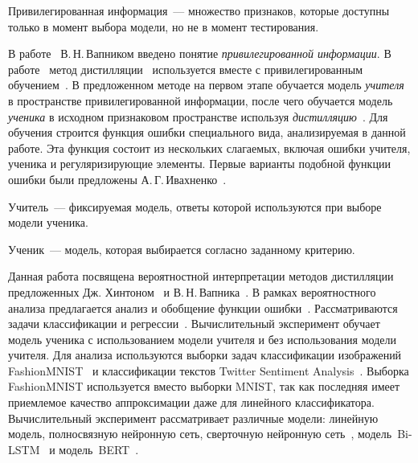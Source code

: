 \documentclass[12pt]{a&t}
\begin{document}
\begin{definition}
Привилегированная информация~--- множество признаков, которые доступны только в момент выбора модели, но не в момент тестирования.
\end{definition}
В работе~\cite{Vapnik2015} В.\,Н.\,Вапником введено понятие \textit{привилегированной информации}. В работе~\cite{Lopez2016} метод дистилляции~\cite{Hinton2015} используется вместе с привилегированным обучением~\cite{Vapnik2015}. В предложенном методе на первом этапе обучается модель \textit{учителя} в пространстве привилегированной информации, после чего обучается модель \textit{ученика} в исходном признаковом пространстве используя \textit{дистилляцию}~\cite{Hinton2015}. Для обучения строится функция ошибки специального вида, анализируемая в данной работе. Эта функция состоит из нескольких слагаемых, включая ошибки учителя, ученика и регуляризирующие элементы.  Первые варианты подобной функции ошибки были предложены А.\,Г.\,Ивахненко~\cite{Ivakhnenko1994}.
\begin{definition}
Учитель~--- фиксируемая модель, ответы которой используются при выборе модели ученика.
\end{definition}
\begin{definition}
Ученик~--- модель, которая выбирается согласно заданному критерию.
\end{definition}

Данная работа посвящена вероятностной интерпретации методов дистилляции предложенных Дж. Хинтоном~\cite{Hinton2015} и В.\,Н.\,Вапника~\cite{Vapnik2015}. В рамках вероятностного анализа предлагается анализ и обобщение функции ошибки~\cite{Hinton2015, Lopez2016}. Рассматриваются задачи классификации и регрессии~\cite{Ivakhnenko1994}. Вычислительный эксперимент обучает модель ученика с использованием модели учителя и без использования модели учителя. Для анализа используются  выборки задач классификации изображений FashionMNIST~\cite{fashionmnist} и классификации текстов Twitter Sentiment Analysis~\cite{twiter2013}. Выборка FashionMNIST используется вместо выборки MNIST, так как последняя имеет приемлемое качество аппроксимации даже для линейного классификатора. Вычислительный эксперимент рассматривает различные модели: линейную модель, полносвязную нейронную сеть, сверточную нейронную сеть~\cite{LeCun1989}, модель~Bi-LSTM~\cite{Schmidhuber1997} и модель~BERT~\cite{Devlin2018}.
\end{document}
